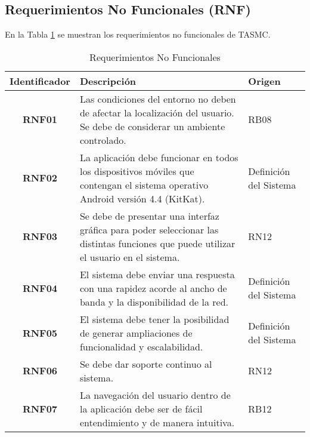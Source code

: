 \subsection{Requerimientos No Funcionales (RNF)}

En la Tabla \ref{tab:reqNoFuncionales} se muestran los requerimientos no funcionales de TASMC.

\begin{table}[h]
	\begin{center}
		\begin{tabular}{|c|p{8.4cm}|p{2.5cm}|}
			\hline \rowcolor[RGB]{51,153,255} 
				\textcolor{blanco}{\bf Identificador} &
				\textcolor{blanco}{\bf Descripción} &
				\textcolor{blanco}{\bf Origen} \\
			\hline 
				\textbf{RNF01} &
				Las condiciones del entorno no deben de afectar la localización del usuario. Se debe de considerar un ambiente controlado. &
				RB08 \\
      		\hline \rowcolor[RGB]{240,248,255}
      			\textbf{RNF02} &
				La aplicación debe funcionar en todos los dispositivos móviles que contengan el sistema operativo Android versión 4.4 (KitKat). &
				Definición del Sistema \\
			\hline 
				\textbf{RNF03} &
				Se debe de presentar una interfaz gráfica para poder seleccionar las distintas funciones que puede utilizar el usuario en el sistema. &
				RN12 \\ 
			\hline \rowcolor[RGB]{240,248,255}
				\textbf{RNF04} &
				El sistema debe enviar una respuesta con una rapidez acorde al ancho de banda y la disponibilidad de la red. &
				Definición del Sistema \\ 
			\hline 
				\textbf{RNF05} &
				El sistema debe tener la posibilidad de generar ampliaciones de funcionalidad y escalabilidad. &
				Definición del Sistema \\ 
			\hline \rowcolor[RGB]{240,248,255}
				\textbf{RNF06} &
				Se debe dar soporte continuo al sistema. &
				RN12 \\ 
			\hline 
				\textbf{RNF07} &
				La navegación del usuario dentro de la aplicación debe ser de fácil entendimiento y de manera intuitiva. &
				RB12 \\ 
			\hline
		\end{tabular}
	\end{center}
	\caption[Requerimientos No Funcionales]{Requerimientos No Funcionales} 
	\label{tab:reqNoFuncionales}
\end{table}